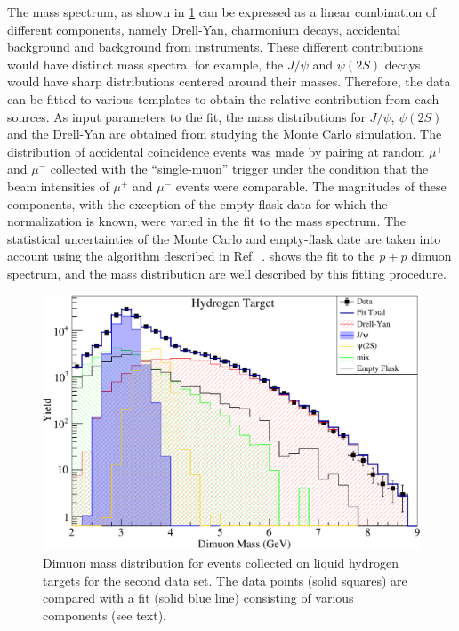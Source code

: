 \documentclass[reprint,aps,unsortedaddress,superscriptaddress,prl,floatfix,showpacs,linenumbers,final]{revtex4-2}
\begin{document}
The mass spectrum, as shown in \cref{fig:massfit} can be expressed as a linear combination of different components,
namely Drell-Yan, charmonium decays, accidental background and background from instruments.
These different contributions would have distinct mass spectra, for example, the $J/\psi$
and $\psi\left(2S\right)$ decays would have sharp distributions centered around their masses.
Therefore, the data can be fitted to various templates to obtain
the relative contribution from each sources.
As input parameters to the fit, the mass distributions for $J/\psi$, $\psi\left(2S\right)$
and the Drell-Yan are obtained from studying the Monte Carlo simulation. %
The distribution of accidental coincidence events was made by pairing at random $\mu^+$ and $\mu^-$ collected with the ``single-muon'' trigger
under the condition that the beam intensities of $\mu^+$ and $\mu^-$ events were comparable.
The magnitudes of these components,
with the exception of the empty-flask data for which the normalization is known,
were varied in the fit to the mass spectrum.
The statistical uncertainties of the Monte Carlo and empty-flask date are taken into account using the algorithm described in Ref.~\cite{barlow1993}.
 shows the fit to the $p+p$ dimuon spectrum,
and the mass distribution are well described by this fitting procedure.
\begin{figure}[htbp!]
	\centering
	\includegraphics[width=\linewidth]{massfit_run56_LH2.pdf}
	\caption{Dimuon mass distribution for events collected
		on liquid hydrogen targets for the second data set.
		The data points (solid squares) are compared with a fit (solid blue line) consisting of
		various components (see text).}
	\label{fig:massfit}
\end{figure}
\end{document}
